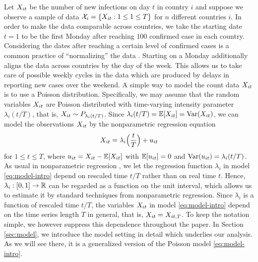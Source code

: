 \documentclass[a4paper,12pt]{article}
\numberwithin{equation}{section}
\begin{document}
Let $X_{it}$ be the number of new infections on day $t$ in country $i$ and suppose we observe a sample of data $\mathcal{X}_i = \{ X_{it}: 1 \le 1 \le T \}$ for $n$ different countries $i$. In order to make the data comparable across countries, we take the starting date $t=1$ to be the {\color{red} first Monday after reaching $100$} confirmed case in each country. {\color{red} Considering the dates after reaching a certain level of confirmed cases is a common practice of ``normalizing'' the data \citep[see e.g.][]{Cohen2020}. Starting on a Monday additionally aligns the data across countries by the day of the week. This allows us to take care of possible weekly cycles in the data which are produced by delays in reporting new cases over the weekend.} 
A simple way to model the count data $X_{it}$ is to use a Poisson distribution. Specifically, we may assume that the random variables $X_{it}$ are Poisson distributed with time-varying intensity parameter $\lambda_i(t/T)$, that is, $X_{it} \sim P_{\lambda_i(t/T)}$. Since $\lambda_i(t/T) = \mathbb{E}[X_{it}] = \textnormal{Var}(X_{it})$, we can model the observations $X_{it}$ by the nonparametric regression equation 
\begin{equation}\label{eq:model-intro}
X_{it} = \lambda_i\Big(\frac{t}{T}\Big) + u_{it} 
\end{equation}
for $1 \le t \le T$, where $u_{it} = X_{it} - \mathbb{E}[X_{it}]$ with $\mathbb{E}[u_{it}] = 0$ and $\textnormal{Var}(u_{it}) = \lambda_i(t/T)$. As usual in nonparametric regression {\color{red}\citep[see e.g.][]{Robinson1989}}, we let the regression function $\lambda_i$ in model \eqref{eq:model-intro} depend on rescaled time $t/T$ rather than on real time $t$. Hence, $\lambda_i: [0,1] \rightarrow \mathbb{R}$ can be regarded as a function on the unit interval, which allows us to estimate it by standard techniques from nonparametric regression. Since $\lambda_i$ is a function of rescaled time $t/T$, the variables $X_{it}$ in model \eqref{eq:model-intro} depend on the time series length $T$ in general, that is, $X_{it} = X_{it,T}$. To keep the notation simple, we however suppress this dependence throughout the paper. In Section \ref{sec:model}, we introduce the model setting in detail which underlies our analysis. As we will see there, it is a generalized version of the Poisson model \eqref{eq:model-intro}.
\end{document}
